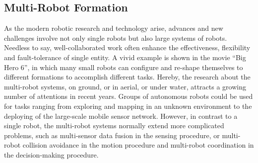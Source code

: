 \subsection{Multi-Robot Formation}

As the modern robotic research and technology arise, advances and new challenges
involve not only single robots but also large systems of robots. 
Needless to say, well-collaborated work often enhance the effectiveness, flexibility and
fault-tolerance of single entity. 
A vivid example is shown in the movie ``Big Hero 6'', in which many small robots can configure and re-shape themselves to different formations to accomplish different tasks.
Hereby, the research about the multi-robot systems, on ground, or in aerial, or under water, attracts a growing number of attentions in recent years\cite{CaoFukKahMen95, DudJenMilWil96, BahSoySah03}. 
Groups of autonomous robots could be used for tasks ranging from exploring and mapping in an unknown environment to the deploying of the large-scale mobile sensor network. 
However, in contrast to a single robot, the multi-robot systems normally extend more complicated problems, such as multi-sensor data fusion in the sensing procedure, or multi-robot collision
avoidance in the motion procedure and multi-robot coordination in the decision-making procedure.

